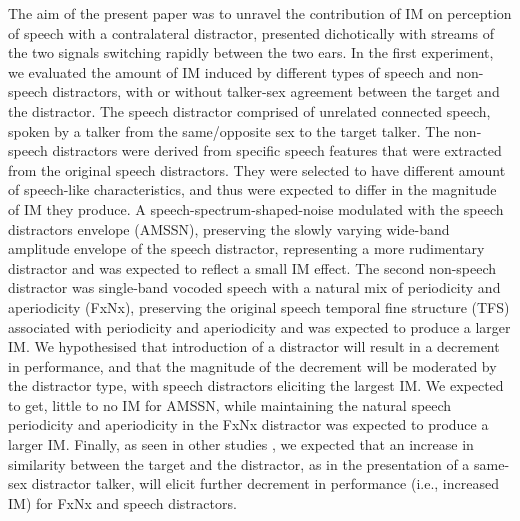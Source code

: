 \documentclass[a4paper, twoside]{templates/ociamthesis}
\begin{document}
The aim of the present paper was to unravel the contribution of IM on perception of speech with a contralateral distractor, presented dichotically with streams of the two signals switching rapidly between the two ears.
In the first experiment, we evaluated the amount of IM induced by different types of speech and non-speech distractors, with or without talker-sex agreement between the target and the distractor. The speech distractor comprised of unrelated connected speech, spoken by a talker from the same/opposite sex to the target talker. The non-speech distractors were derived from specific speech features that were extracted from the original speech distractors. They were selected to have different amount of speech-like characteristics, and thus were expected to differ in the magnitude of IM they produce. A speech-spectrum-shaped-noise modulated with the speech distractors envelope (AMSSN), preserving the slowly varying wide-band amplitude envelope of the speech distractor, representing a more rudimentary distractor and was expected to reflect a small IM effect. The second non-speech distractor was single-band vocoded speech with a natural mix of periodicity and aperiodicity (FxNx), preserving the original speech temporal fine structure (TFS) associated with periodicity and aperiodicity and was expected to produce a larger IM. We hypothesised that introduction of a distractor will result in a decrement in performance, and that the magnitude of the decrement will be moderated by the distractor type, with speech distractors eliciting the largest IM. We expected to get, little to no IM for AMSSN, while maintaining the natural speech periodicity and aperiodicity in the FxNx distractor was expected to produce a larger IM. Finally, as seen in other studies \autocites[e.g.,][]{Brungart2001,Festen1990}, we expected that an increase in similarity between the target and the distractor, as in the presentation of a same-sex distractor talker, will elicit further decrement in performance (i.e., increased IM) for FxNx and speech distractors.\\
\end{document}
